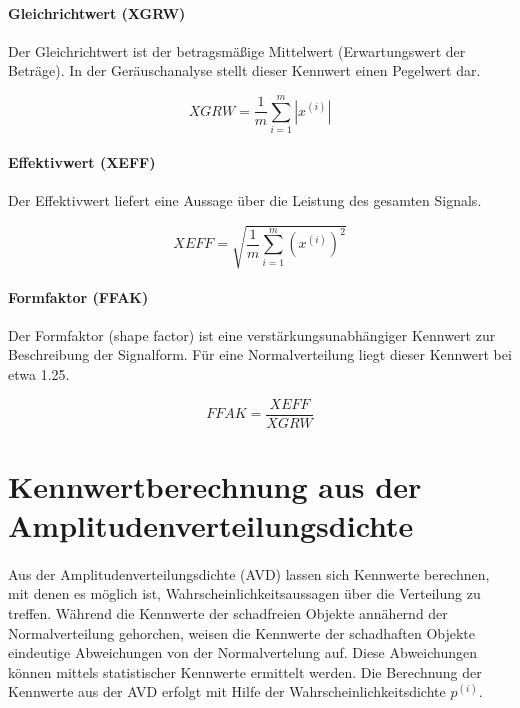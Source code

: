 \paragraph{Gleichrichtwert (XGRW)\\}
Der Gleichrichtwert ist der betragsm\"a\ss{}ige Mittelwert (Erwartungswert der Betr\"age). In der Ger\"auschanalyse stellt dieser Kennwert einen Pegelwert dar.

\begin{equation}
\mathit{XGRW} = \frac{1}{m}\sum_{i=1}^{m}|x^{(i)}|
\end{equation}

\paragraph{Effektivwert (XEFF)\\}
Der Effektivwert liefert eine Aussage \"uber die Leistung des gesamten Signals.

\begin{equation}
\mathit{XEFF}=\sqrt{ \frac{1}{m}\sum_{i=1}^{m}(x^{(i)})^{2}}
\end{equation}

\paragraph{Formfaktor (FFAK)\\}
Der Formfaktor (shape factor) ist eine verst\"arkungsunabh\"angiger Kennwert zur Beschreibung der Signalform. F\"ur eine Normalverteilung liegt dieser Kennwert bei etwa 1.25.

\begin{equation}
\mathit{FFAK}=\frac{\mathit{XEFF}}{\mathit{XGRW}}
\end{equation}

\section{Kennwertberechnung aus der Amplitudenverteilungsdichte}

\paragraph{}
Aus der Amplitudenverteilungsdichte (AVD) lassen sich Kennwerte berechnen, mit denen es m\"oglich ist, Wahrscheinlichkeitsaussagen \"uber die Verteilung zu treffen. W\"ahrend die Kennwerte der schadfreien Objekte ann\"ahernd der Normalverteilung gehorchen, weisen die Kennwerte der schadhaften Objekte eindeutige Abweichungen von der Normalvertelung auf. Diese Abweichungen k\"onnen mittels statistischer Kennwerte ermittelt werden. Die Berechnung der Kennwerte aus der AVD erfolgt mit Hilfe der Wahrscheinlichkeitsdichte $p^{(i)}$.


